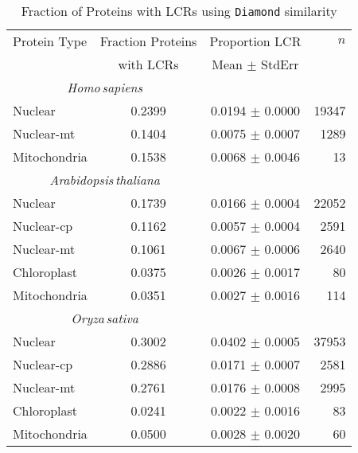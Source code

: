 \documentclass[a4paper,12pt]{article}
\newcommand{\arab}{\mbox{\textit{Arabidopsis\,thaliana}}\xspace}
\newcommand{\oryz}{\mbox{\textit{Oryza\,sativa}}\xspace}
\newcommand{\homo}{\mbox{\textit{Homo\,sapiens}}\xspace}
\renewcommand{\diamond}{\mbox{\texttt{Diamond}}\xspace}
\newcommand{\humanNucNumberBlastP}{19347\xspace}
\newcommand{\humanNucMitoNoBlastP}{1289\xspace}
\newcommand{\humanMitoNo}{13\xspace}
\begin{document}
\begin{multicols}{2}
\begin{table*}
    \caption{Fraction of Proteins with LCRs using \diamond similarity}
    \label{tab:blastp}
    \centering
    \begin{tabular}{lccr}
	\toprule
	Protein Type & Fraction Proteins & \multicolumn{1}{c}{Proportion LCR} & $n$ \\
		     & with LCRs         & Mean $\pm$ StdErr &      \\
	\midrule \multicolumn{2}{c}{\quad\quad\homo}        & & \\
        Nuclear      & 0.2399 & 0.0194 $\pm$ 0.0000 & 19347 \\ %
        Nuclear-mt      & 0.1404 & 0.0075 $\pm$ 0.0007 & 1289 \\  %
	Mitochondria & 0.1538 & 0.0068 $\pm$ 0.0046 & 13 \\    %
	\midrule \multicolumn{2}{c}{\quad\quad\arab}       & & \\
        Nuclear      & 0.1739 & 0.0166 $\pm$ 0.0004 & 22052 \\ %
        Nuclear-cp      & 0.1162 & 0.0057 $\pm$ 0.0004 & 2591 \\  %
        Nuclear-mt      & 0.1061 & 0.0067 $\pm$ 0.0006 & 2640 \\  %
	Chloroplast  & 0.0375 & 0.0026 $\pm$ 0.0017 & 80 \\    %
	Mitochondria & 0.0351 & 0.0027 $\pm$ 0.0016 & 114 \\   %
	\midrule \multicolumn{2}{c}{\quad\quad\oryz}      & & \\
        Nuclear      & 0.3002 & 0.0402 $\pm$ 0.0005 & 37953 \\ %
        Nuclear-cp      & 0.2886 & 0.0171 $\pm$ 0.0007 & 2581 \\  %
        Nuclear-mt      & 0.2761 & 0.0176 $\pm$ 0.0008 & 2995 \\  %
	Chloroplast  & 0.0241 & 0.0022 $\pm$ 0.0016 & 83 \\    %
	Mitochondria & 0.0500 & 0.0028 $\pm$ 0.0020 & 60 \\    %
	\bottomrule
    \end{tabular}
\end{table*} 



\newcommand{\location}{homo_blastp_lcrproportions}
\newcommand{\nucNumber}{\humanNucNumberBlastP}
\newcommand{\nucChloNumber}{0} %
\newcommand{\nucMitoNumber}{\humanNucMitoNoBlastP}
\newcommand{\chloNumber}{0} %
\newcommand{\mitoNumber}{\humanMitoNo}


\end{multicols}
\end{document}
